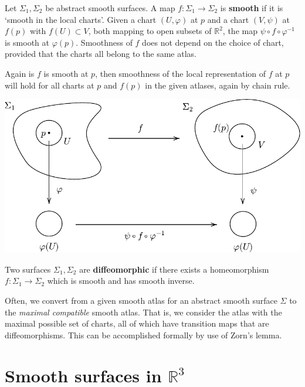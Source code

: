 \documentclass[a4paper,11pt]{article}
\begin{document}
\begin{definition}
	Let \( \Sigma_1, \Sigma_2 \) be abstract smooth surfaces.
	A map \( f \colon \Sigma_1 \to \Sigma_2 \) is \textbf{smooth} if it is `smooth in the local charts'.
	Given a chart \( (U, \varphi) \) at \( p \) and a chart \( (V, \psi) \) at \( f(p) \) with $ f(U) \subset V $, both mapping to open subsets of \( \mathbb R^2 \), the map \( \psi \circ f \circ \varphi^{-1} \) is smooth at \( \varphi(p) \).
	Smoothness of \( f \) does not depend on the choice of chart, provided that the charts all belong to the same atlas.
\end{definition}
Again is $f$ is smooth at $p$, then smoothness of the local representation of $f$ at $p$ will hold for all charts at $p$ and $f(p)$ in the given atlases, again by chain rule.
\begin{center}
\includegraphics[scale=0.8]{SmoothFunction2}
\end{center}
\begin{definition}
	Two surfaces \( \Sigma_1, \Sigma_2 \) are \textbf{diffeomorphic} if there exists a homeomorphism \( f \colon \Sigma_1 \to \Sigma_2 \) which is smooth and has smooth inverse.
\end{definition}
\begin{remark}
	Often, we convert from a given smooth atlas for an abstract smooth surface \( \Sigma \) to the \textit{maximal compatible} smooth atlas.
	That is, we consider the atlas with the maximal possible set of charts, all of which have transition maps that are diffeomorphisms.
	This can be accomplished formally by use of Zorn's lemma.
\end{remark}

\section{Smooth surfaces in \( \mathbb R^3 \)}
\end{document}

